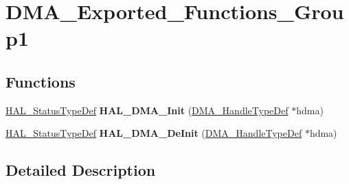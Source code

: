 \hypertarget{group___d_m_a___exported___functions___group1}{}\section{D\+M\+A\+\_\+\+Exported\+\_\+\+Functions\+\_\+\+Group1}
\label{group___d_m_a___exported___functions___group1}
\subsection*{Functions}
\begin{DoxyCompactItemize}
\item 
\mbox{\label{group___d_m_a___exported___functions___group1_ga0fbcb690074233a03f2fa366dc22ff01}} 
\hyperlink{stm32f1xx__hal__def_8h_a63c0679d1cb8b8c684fbb0632743478f}{H\+A\+L\+\_\+\+Status\+Type\+Def} {\bfseries H\+A\+L\+\_\+\+D\+M\+A\+\_\+\+Init} (\hyperlink{group___d_m_a___exported___types_ga92b907d56a9c29b93d46782a7a04f91e}{D\+M\+A\+\_\+\+Handle\+Type\+Def} $\ast$hdma)
\item 
\mbox{\label{group___d_m_a___exported___functions___group1_ga7bb8587d642da11252a97f5c41c389ef}} 
\hyperlink{stm32f1xx__hal__def_8h_a63c0679d1cb8b8c684fbb0632743478f}{H\+A\+L\+\_\+\+Status\+Type\+Def} {\bfseries H\+A\+L\+\_\+\+D\+M\+A\+\_\+\+De\+Init} (\hyperlink{group___d_m_a___exported___types_ga92b907d56a9c29b93d46782a7a04f91e}{D\+M\+A\+\_\+\+Handle\+Type\+Def} $\ast$hdma)
\end{DoxyCompactItemize}


\subsection{Detailed Description}
